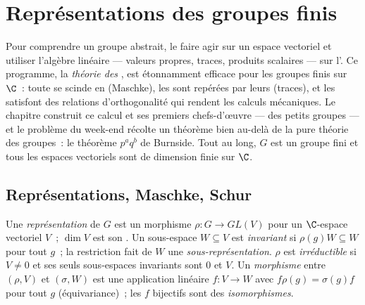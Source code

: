 \chapter{Représentations des groupes finis}\label{ch:b3:representations}

Pour comprendre un groupe abstrait, le faire agir sur un espace
vectoriel et utiliser l'algèbre linéaire --- valeurs propres,
traces, produits scalaires --- sur l'. Ce programme, la
\emph{théorie des }, est étonnamment efficace pour
les groupes finis sur $\C$~: toute  se scinde en
 (Maschke), les  sont repérées par leurs
\emph{} (traces), et les  satisfont des
relations d'orthogonalité qui rendent les calculs mécaniques. Le
chapitre construit ce calcul et ses premiers chefs-d'œuvre ---
 des petits groupes --- et le problème du
week-end récolte un théorème bien au-delà de la pure théorie des
groupes~: le théorème $p^aq^b$ de Burnside. Tout au long, $G$ est
un groupe fini et tous les espaces vectoriels sont de dimension
finie sur $\C$.

\section{Représentations, Maschke, Schur}

\begin{definition}\label{def:b3:representations:rep}
Une \emph{représentation} de $G$ est un
morphisme $\rho \colon G \to GL(V)$ pour un $\C$-espace vectoriel
$V$~; $\dim V$ est son \emph{}. Un sous-espace $W \subseteq
V$ est \emph{invariant} si $\rho(g)W \subseteq W$ pour tout $g$~;
la restriction fait de $W$ une \emph{sous-représentation}. $\rho$
est \emph{irréductible} si $V
\neq 0$ et ses seuls sous-espaces invariants sont $0$ et $V$. Un
\emph{morphisme} entre $(\rho, V)$ et $(\sigma, W)$ est une
application linéaire $f\colon V \to W$ avec $f\rho(g) =
\sigma(g)f$ pour tout $g$ (équivariance)~; les $f$ bijectifs sont
des \emph{isomorphismes}.
\end{definition}

